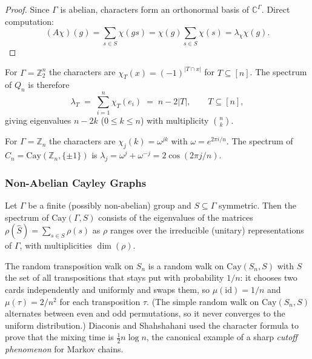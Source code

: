 \begin{proof}
Since $\Gamma$ is abelian, characters form an orthonormal basis of
$\mathbb C^\Gamma$. Direct computation:
\[
  (A \chi)(g) = \sum_{s \in S} \chi(g s)
              = \chi(g) \sum_{s \in S} \chi(s)
              = \lambda_\chi \chi(g).
\]
\end{proof}

\begin{example}
For $\Gamma = \mathbb Z_2^n$ the characters are
$\chi_T(x) = (-1)^{|T \cap x|}$ for $T \subseteq [n]$. The spectrum of
$Q_n$ is therefore
\[
  \lambda_T \;=\; \sum_{i = 1}^{n} \chi_T(e_i) \;=\; n - 2|T|,
  \qquad T \subseteq [n],
\]
giving eigenvalues $n - 2k$ ($0 \le k \le n$) with multiplicity
$\binom{n}{k}$.
\end{example}

\begin{example}
For $\Gamma = \mathbb Z_n$ the characters are $\chi_j(k) = \omega^{jk}$
with $\omega = e^{2\pi i/n}$. The spectrum of $C_n = \mathrm{Cay}(\mathbb Z_n, \{\pm 1\})$
is $\lambda_j = \omega^j + \omega^{-j} = 2\cos(2\pi j/n)$.
\end{example}

\subsubsection{Non-Abelian Cayley Graphs}

\begin{theorem}
Let $\Gamma$ be a finite (possibly non-abelian) group and
$S \subseteq \Gamma$ symmetric. Then the spectrum of
$\mathrm{Cay}(\Gamma, S)$ consists of the eigenvalues of the matrices
$\rho(\hat S) = \sum_{s \in S} \rho(s)$ as $\rho$ ranges over the
irreducible (unitary) representations of $\Gamma$, with multiplicities
$\dim(\rho)$.
\end{theorem}

\begin{example}
The random transposition walk on $S_n$ is a random walk on
$\mathrm{Cay}(S_n, S)$ with $S$ the set of all transpositions that
stays put with probability $1/n$: it chooses two cards independently
and uniformly and swaps them, so $\mu(\mathrm{id}) = 1/n$ and
$\mu(\tau) = 2/n^2$ for each transposition $\tau$. (The simple random
walk on $\mathrm{Cay}(S_n, S)$ alternates between even and odd
permutations, so it never converges to the uniform distribution.)
Diaconis and Shahshahani used the character formula to prove that the
mixing time is $\frac{1}{2} n \log n$, the canonical example of a
sharp \emph{cutoff phenomenon} for Markov chains.
\end{example}

